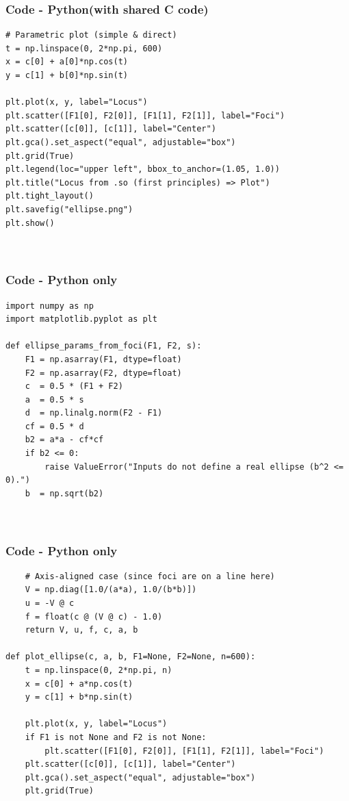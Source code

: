 \documentclass{beamer}
\theoremstyle{remark}
\numberwithin{equation}{section}
\begin{document}
\begin{frame}[fragile]
\frametitle{Code - Python(with shared C code)}
\begin{lstlisting}
# Parametric plot (simple & direct)
t = np.linspace(0, 2*np.pi, 600)
x = c[0] + a[0]*np.cos(t)
y = c[1] + b[0]*np.sin(t)

plt.plot(x, y, label="Locus")
plt.scatter([F1[0], F2[0]], [F1[1], F2[1]], label="Foci")
plt.scatter([c[0]], [c[1]], label="Center")
plt.gca().set_aspect("equal", adjustable="box")
plt.grid(True)
plt.legend(loc="upper left", bbox_to_anchor=(1.05, 1.0))
plt.title("Locus from .so (first principles) => Plot")
plt.tight_layout()
plt.savefig("ellipse.png")
plt.show()



\end{lstlisting}
\end{frame}



\begin{frame}[fragile]
\frametitle{Code - Python only}
\begin{lstlisting}
import numpy as np
import matplotlib.pyplot as plt

def ellipse_params_from_foci(F1, F2, s):
    F1 = np.asarray(F1, dtype=float)
    F2 = np.asarray(F2, dtype=float)
    c  = 0.5 * (F1 + F2)
    a  = 0.5 * s
    d  = np.linalg.norm(F2 - F1)
    cf = 0.5 * d
    b2 = a*a - cf*cf
    if b2 <= 0:
        raise ValueError("Inputs do not define a real ellipse (b^2 <= 0).")
    b  = np.sqrt(b2)



\end{lstlisting}
\end{frame}

\begin{frame}[fragile]
\frametitle{Code - Python only}
\begin{lstlisting}
    # Axis-aligned case (since foci are on a line here)
    V = np.diag([1.0/(a*a), 1.0/(b*b)])
    u = -V @ c
    f = float(c @ (V @ c) - 1.0)
    return V, u, f, c, a, b

def plot_ellipse(c, a, b, F1=None, F2=None, n=600):
    t = np.linspace(0, 2*np.pi, n)
    x = c[0] + a*np.cos(t)
    y = c[1] + b*np.sin(t)

    plt.plot(x, y, label="Locus")
    if F1 is not None and F2 is not None:
        plt.scatter([F1[0], F2[0]], [F1[1], F2[1]], label="Foci")
    plt.scatter([c[0]], [c[1]], label="Center")
    plt.gca().set_aspect("equal", adjustable="box")
    plt.grid(True)

\end{lstlisting}
\end{frame}
\end{document}
